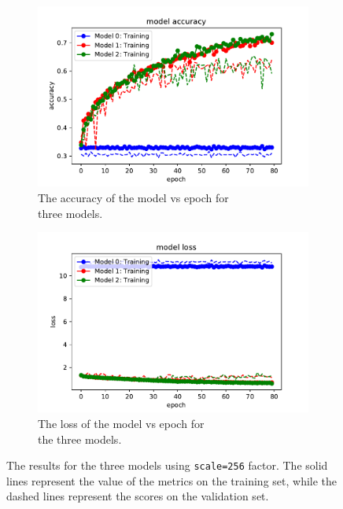 \documentclass[10pt,a4paper]{article}
\begin{document}
\begin{figure}[h]
\centering
\begin{subfigure}{.7\textwidth}
  \centering
  \includegraphics[scale=0.5]{accuracy_vs_epoch_256.pdf}
  \caption{The accuracy of the model vs epoch for\\ three models.}
  \label{fig:sub1 256}
\end{subfigure}%
\begin{subfigure}{.6\textwidth}
  \centering
  \includegraphics[scale=0.5]{loss_vs_epoch_256.pdf}
  \caption{The loss of the model vs epoch for\\ the three models.}
  \label{fig:sub2 256}
\end{subfigure}
\caption{The results for the three models using \lstinline{scale=256} factor. The solid lines represent the value of the metrics on the training set, while the dashed lines represent the scores on the validation set.}
\label{fig: Final results 256}
\end{figure}
\end{document}

